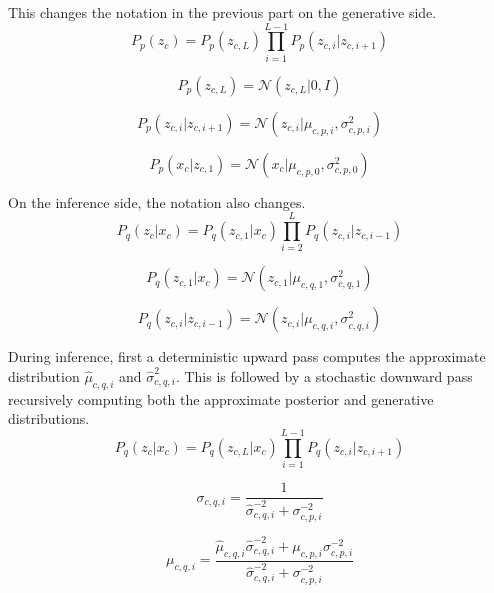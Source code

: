 \documentclass[10pt,twocolumn,letterpaper]{article}
\begin{document}
This changes the notation in the previous part on the generative side. 
\begin{equation}
P_{p}(z_c) = P_{p}(z_{c,L}) \prod_{i=1}^{L-1} P_{p}(z_{c,i}|z_{c,i+1})
\end{equation}

\begin{equation}
P_{p}(z_{c,L}) = \mathcal{N}(z_{c,L} | 0, I)
\end{equation}

\begin{equation}
P_{p}(z_{c,i}|z_{c,i+1}) = \mathcal{N}(z_{c,i}|\mu_{c,p,i}, \sigma_{c,p,i}^2)
\end{equation}

\begin{equation}
P_{p}(x_c | z_{c,1}) = \mathcal{N}(x_c | \mu_{c,p,0}, \sigma_{c,p,0}^2)
\end{equation}

On the inference side, the notation also changes.
\begin{equation}
P_{q}(z_c|x_c) = P_{q}(z_{c,1}|x_c) \prod_{i=2}^{L} P_{q}(z_{c,i}|z_{c,i-1})
\end{equation}

\begin{equation}
P_{q}(z_{c,1}|x_c) = \mathcal{N}(z_{c,1} | \mu_{c,q,1}, \sigma_{c,q,1}^2)
\end{equation}

\begin{equation}
P_{q}(z_{c,i}|z_{c,i-1}) = \mathcal{N}(z_{c,i}|\mu_{c,q,i}, \sigma_{c,q,i}^2)
\end{equation}

During inference, first a deterministic upward pass computes the approximate distribution $\hat{\mu}_{c,q,i}$ and $\hat{\sigma}_{c,q,i}^2$. 
This is followed by a stochastic downward pass recursively computing both the approximate posterior and generative distributions.
\begin{equation}
P_{q}(z_c|x_c) = P_{q}(z_{c,L}|x_c) \prod_{i=1}^{L-1} P_{q}(z_{c,i}|z_{c,i+1})
\end{equation}

\begin{equation}
\sigma_{c,q,i} = \frac{1}{\hat{\sigma}_{c,q,i}^{-2} + \sigma_{c,p,i}^{-2}}
\end{equation}

\begin{equation}
\mu_{c,q,i} = \frac{\hat{\mu}_{c,q,i} \hat{\sigma}_{c,q,i}^{-2} + {\mu}_{c,p,i} {\sigma}_{c,p,i}^{-2}}{\hat{\sigma}_{c,q,i}^{-2} + {\sigma}_{c,p,i}^{-2}}
\end{equation}
\end{document}
